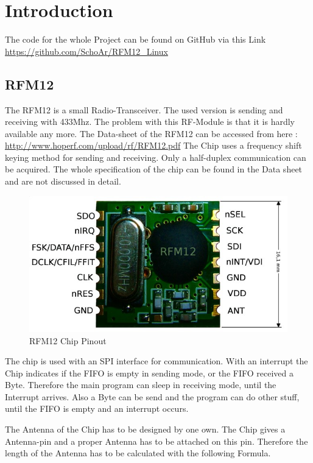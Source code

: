 \chapter{Introduction}

The code for the whole Project can be found on GitHub via this Link \url{https://github.com/SchoAr/RFM12_Linux}

\section{RFM12}
The RFM12 is a small Radio-Transceiver. The used version is sending and receiving with 433Mhz. The problem with this RF-Module is that it is hardly available any more.\newline
The Data-sheet of the RFM12 can be accessed from here : \url{http://www.hoperf.com/upload/rf/RFM12.pdf}\newline
The Chip uses a frequency shift keying method for sending and receiving. Only a half-duplex communication can be acquired. The whole specification of the chip can be found in the Data sheet and are not discussed in detail.

\begin{figure}[H]
	\centering
		\includegraphics[width=1.00\textwidth]{picture/rfm12.png}
	\caption{RFM12 Chip Pinout}
	\label{fig:rfm12}
\end{figure}

The chip is used with an SPI interface for communication. With an interrupt the Chip indicates if the FIFO is empty in sending mode, or the FIFO received a Byte. Therefore the main program can sleep in receiving mode, until the Interrupt arrives. Also a Byte can be send and the program can do other stuff, until the FIFO is empty and an interrupt occurs.\newline

The Antenna of the Chip has to be designed by one own. The Chip gives a Antenna-pin and a proper Antenna has to be attached on this pin. Therefore the length of the Antenna has to be calculated with the following Formula.

